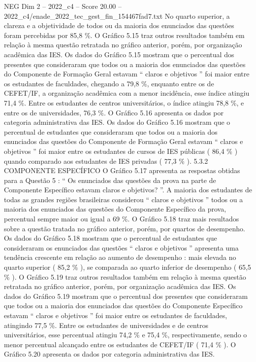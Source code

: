 \begin{textsample}{NEG Dim 2 – 2022\_c4 – Score 20.00 – 2022\_c4/enade\_2022\_tec\_gest\_fin\_154467fad7.txt}
No quarto superior, a clareza e a objetividade de todos ou da maioria dos enunciados das questões foram percebidas por 85,8 \%.
O Gráfico 5.15 traz outros resultados também em relação à mesma questão retratada no gráfico anterior, porém, por organização acadêmica das IES.
Os dados do Gráfico 5.15 mostram que o percentual dos presentes que consideraram que todos ou a maioria dos enunciados das questões do Componente de Formação Geral estavam “ claros e objetivos ” foi maior entre os estudantes de faculdades, chegando a 79,8 \%, enquanto entre os de CEFET/IF, a organização acadêmica com a menor incidência, esse índice atingiu 71,4 \%.
Entre os estudantes de centros universitários, o índice atingiu 78,8 \%, e entre os de universidades, 76,3 \%.
O Gráfico 5.16 apresenta os dados por categoria administrativa das IES.
Os dados do Gráfico 5.16 mostram que o percentual de estudantes que consideraram que todos ou a maioria dos enunciados das questões do Componente de Formação Geral estavam “ claros e objetivos ” foi maior entre os estudantes de cursos de IES públicas ( 86,4 \% ) quando comparado aos estudantes de IES privadas ( 77,3 \% ). 5.3.2 COMPONENTE ESPECÍFICO O Gráfico 5.17 apresenta as respostas obtidas para a Questão 5 : “ Os enunciados das questões da prova na parte de Componente Específico estavam claros e objetivos? ”.
A maioria dos estudantes de todas as grandes regiões brasileiras considerou “ claros e objetivos ” todos ou a maioria dos enunciados das questões do Componente Específico da prova, percentual sempre maior ou igual a 69 \%.
O Gráfico 5.18 traz mais resultados sobre a questão tratada no gráfico anterior, porém, por quartos de desempenho.
Os dados do Gráfico 5.18 mostram que o percentual de estudantes que consideraram os enunciados das questões “ claros e objetivos ” apresenta uma tendência crescente em relação ao aumento de desempenho : mais elevada no quarto superior ( 85,2 \% ), se comparada ao quarto inferior de desempenho ( 65,5 \% ).
O Gráfico 5.19 traz outros resultados também em relação à mesma questão retratada no gráfico anterior, porém, por organização acadêmica das IES.
Os dados do Gráfico 5.19 mostram que o percentual dos presentes que consideraram que todos ou a maioria dos enunciados das questões do Componente Específico estavam “ claros e objetivos ” foi maior entre os estudantes de faculdades, atingindo 77,5 \%.
Entre os estudantes de universidades e de centros universitários, esse percentual atingiu 74,2 \% e 75,4 \%, respectivamente, sendo o menor percentual alcançado entre os estudantes de CEFET/IF ( 71,4 \% ).
O Gráfico 5.20 apresenta os dados por categoria administrativa das IES.

\end{textsample}
